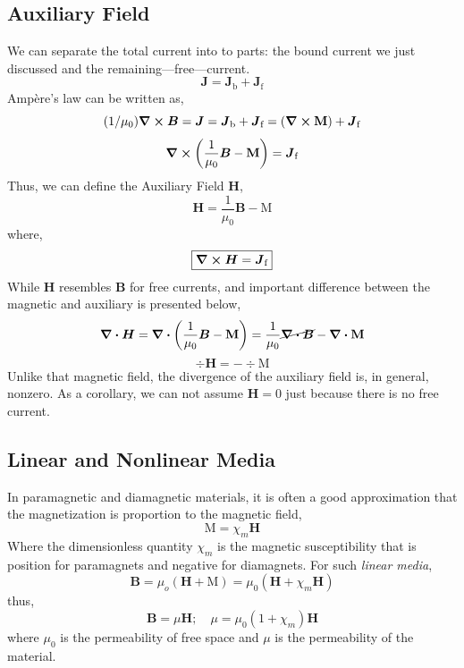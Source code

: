 \documentclass[12pt]{report}
\numberwithin{equation}{section}
\def\M{{\mbox{$\boldsymbol{\mathrm{M}}$}}}
\def\B{{\mbox{$\boldsymbol{B}$}}}
\def\H{{\mbox{$\boldsymbol{H}$}}}
\newcommand{\bd}[1]{\boldsymbol{#1}}
\renewcommand{\b}[1]{\boldsymbol{#1}}
\begin{document}
	\subsection{Auxiliary Field}
	We can separate the total current into to parts: the bound current we just discussed and the remaining---free---current.
	\begin{equation}
		\boxed{\b{J} = \bd{J}_\text{b} + \bd{J}_\text{f}} 
	\end{equation}
	Amp\`ere's law can be written as,
	\begin{equation}
		(1/\mu_0)\curl \B = \bd{J} = \bd{J}_\text{b} + \bd{J}_\text{f} = \left(\curl\M\right)+ \bd{J}_\text{f} 
	\end{equation}
	\begin{equation}
		\curl \left(\frac{1}{\mu_0}\B - \M\right) =  \bd{J}_\text{f} 
	\end{equation}
	Thus, we can define the Auxiliary Field $ \H $, 
	\begin{equation}
		\boxed{\H = \frac{1}{\mu_0}\B - \M}
	\end{equation}
	where,
	\begin{equation}
		\boxed{\curl \H = \bd{J}_\text{f}}
	\end{equation}
	While $ \H $ resembles $ \B $ for free currents, and important difference between the magnetic and auxiliary is presented below,
	\begin{equation}
		\div \H  = \div \left(\frac{1}{\mu_0}\B - \M\right) = \frac{1}{\mu_0}\cancel{\div \B }- \div \M
	\end{equation} 
	\begin{equation}
		\boxed{\div\H = -\div \M}
	\end{equation}
	Unlike that magnetic field, the divergence of the auxiliary field is, in general, nonzero. As a corollary, we can not assume $ \H=0 $ just because there is no free current.
	
	\subsection{Linear and Nonlinear Media}
	In paramagnetic and diamagnetic materials, it is often a good approximation that the magnetization is proportion to the magnetic field,
	\begin{equation}
		\boxed{\M = \chi_m\H}
	\end{equation}
	Where the dimensionless quantity $ \chi_m $ is the magnetic susceptibility that is position for paramagnets and negative for diamagnets. For such \textit{linear media},
	\begin{equation}
		\B = \mu_o (\H + \M) = \mu_0 (\H + \chi_m\H)
	\end{equation}
	thus,
	\begin{equation}
		\boxed{\B = \mu\H;\quad \mu = \mu_0(1+\chi_m)\H}
	\end{equation}
	where $ \mu_0 $ is the permeability of free space and $ \mu $ is the permeability of the material.
	
\end{document}
